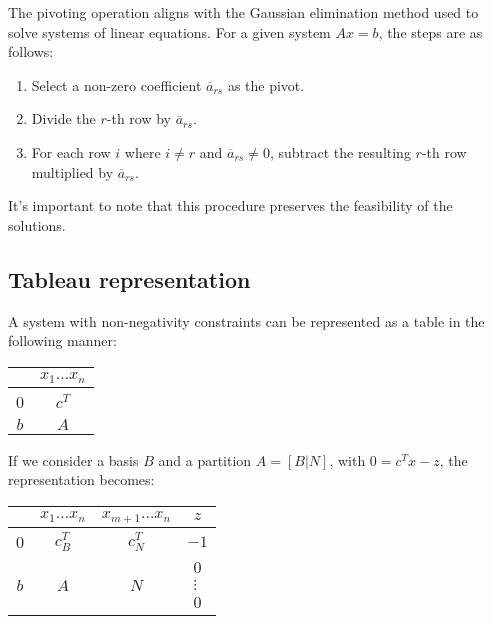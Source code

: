 The pivoting operation aligns with the Gaussian elimination method used to solve systems of linear equations. 
For a given system $Ax=b$, the steps are as follows:
\begin{enumerate}
    \item Select a non-zero coefficient $\overline{a}_{rs}$ as the pivot.
    \item Divide the $r$-th row by $\overline{a}_{rs}$. 
    \item For each row $i$ where $i \neq r$ and $\overline{a}_{rs} \neq 0$, subtract the resulting $r$-th row multiplied by $\overline{a}_{rs}$. 
\end{enumerate}
It's important to note that this procedure preserves the feasibility of the solutions.

\subsection{Tableau representation}
A system with non-negativity constraints can be represented as a table in the following manner:
\begin{table}[H]
    \centering
    \begin{tabular}{cc}
                              & $x_1 \dots x_n$            \\ \hline
    \multicolumn{1}{|c|}{0}   & \multicolumn{1}{c|}{$c^T$} \\ \hline
    \multicolumn{1}{|c|}{$b$} & \multicolumn{1}{c|}{$A$}   \\ \hline
    \end{tabular}
\end{table}
If we consider a basis $B$ and a partition $A=\left[B|N\right]$, with $0=c^Tx-z$, the representation becomes:
\begin{table}[H]
    \centering
    \begin{tabular}{cccc}
                              & $x_1 \dots x_n$              & $x_{m+1}\dots x_n$           & $z$                                                                                                                                                                      \\ \hline
    \multicolumn{1}{|c|}{0}   & \multicolumn{1}{c|}{$c^T_B$} & \multicolumn{1}{c|}{$c^T_N$} & \multicolumn{1}{c|}{$-1$}                                                                                                                                                \\ \hline
    \multicolumn{1}{|c|}{$b$} & \multicolumn{1}{c|}{$A$}     & \multicolumn{1}{c|}{$N$}     & \multicolumn{1}{c|}{$\begin{matrix}0\\\vdots\\0\end{matrix}$} \\ \hline
    \end{tabular}
\end{table}
